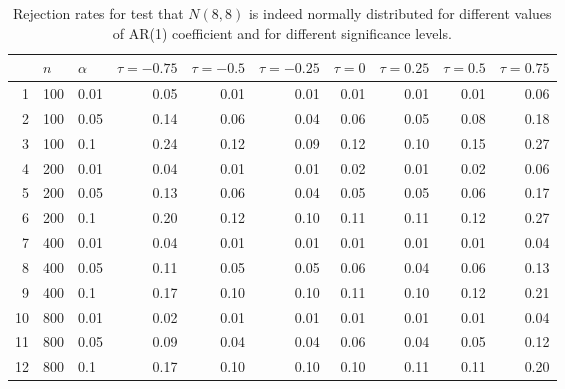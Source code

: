 \begin{table}[ht]
\centering
\caption{Rejection rates for test that $N(8, 8)$ is indeed
                   normally distributed for
                   different values of AR(1) coefficient and for different 
                   significance levels.} 
\label{table:rr_norm}
\begin{tabular}{rllrrrrrrr}
  \hline
 & $n$ & $\alpha$ & $\tau = -0.75$ & $\tau = -0.5$ & $\tau = -0.25$ & $\tau = 0$ & $\tau = 0.25$ & $\tau = 0.5$ & $\tau = 0.75$ \\ 
  \hline
1 & 100 & 0.01 & 0.05 & 0.01 & 0.01 & 0.01 & 0.01 & 0.01 & 0.06 \\ 
  2 & 100 & 0.05 & 0.14 & 0.06 & 0.04 & 0.06 & 0.05 & 0.08 & 0.18 \\ 
  3 & 100 & 0.1 & 0.24 & 0.12 & 0.09 & 0.12 & 0.10 & 0.15 & 0.27 \\ 
  4 & 200 & 0.01 & 0.04 & 0.01 & 0.01 & 0.02 & 0.01 & 0.02 & 0.06 \\ 
  5 & 200 & 0.05 & 0.13 & 0.06 & 0.04 & 0.05 & 0.05 & 0.06 & 0.17 \\ 
  6 & 200 & 0.1 & 0.20 & 0.12 & 0.10 & 0.11 & 0.11 & 0.12 & 0.27 \\ 
  7 & 400 & 0.01 & 0.04 & 0.01 & 0.01 & 0.01 & 0.01 & 0.01 & 0.04 \\ 
  8 & 400 & 0.05 & 0.11 & 0.05 & 0.05 & 0.06 & 0.04 & 0.06 & 0.13 \\ 
  9 & 400 & 0.1 & 0.17 & 0.10 & 0.10 & 0.11 & 0.10 & 0.12 & 0.21 \\ 
  10 & 800 & 0.01 & 0.02 & 0.01 & 0.01 & 0.01 & 0.01 & 0.01 & 0.04 \\ 
  11 & 800 & 0.05 & 0.09 & 0.04 & 0.04 & 0.06 & 0.04 & 0.05 & 0.12 \\ 
  12 & 800 & 0.1 & 0.17 & 0.10 & 0.10 & 0.10 & 0.11 & 0.11 & 0.20 \\ 
   \hline
\end{tabular}
\end{table}

